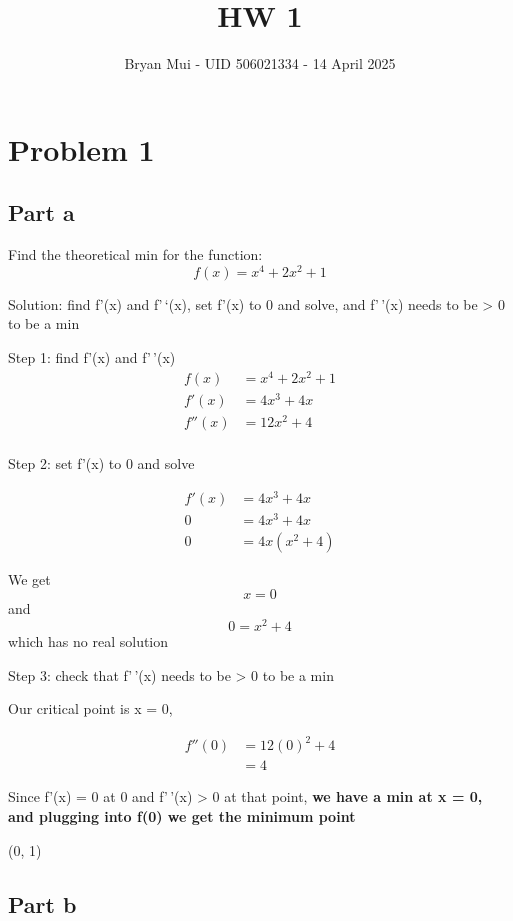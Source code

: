 \documentclass[
  letterpaper,
  DIV=11,
  numbers=noendperiod]{scrartcl}
\title{HW 1}
\author{Bryan Mui - UID 506021334 - 14 April 2025}
\date{}
\begin{document}
\maketitle


\section{Problem 1}\label{problem-1}

\subsection{Part a}\label{part-a}

Find the theoretical min for the function: \[
f(x) = x^4 + 2x^2 + 1
\]

Solution: find f'(x) and f'\,`(x), set f'(x) to 0 and solve, and
f'\,'(x) needs to be \textgreater{} 0 to be a min

Step 1: find f'(x) and f'\,'(x) \begin{align}
  f(x) &= x^4 + 2x^2 + 1 \\ 
 f'(x) &= 4x^3 + 4x  \\
f''(x) &= 12x^2 + 4 \\
\end {align}

Step 2: set f'(x) to 0 and solve

\begin{align}
f'(x) &= 4x^3 + 4x  \\
    0 &= 4x^3 + 4x \\
    0 &= 4x(x^2 + 4)
\end{align}

We get \[x = 0\] and \[0 = x^2 +4\] which has no real solution

Step 3: check that f'\,'(x) needs to be \textgreater{} 0 to be a min

Our critical point is x = 0,

\begin{align}
f''(0)  &= 12(0)^2 + 4 \\
        &= 4
\end{align}

Since f'(x) = 0 at 0 and f'\,'(x) \textgreater{} 0 at that point,
\textbf{we have a min at x = 0, and plugging into f(0) we get the
minimum point}

\begin{center} (0, 1) \end{center}

\subsection{Part b}\label{part-b}
\end{document}
